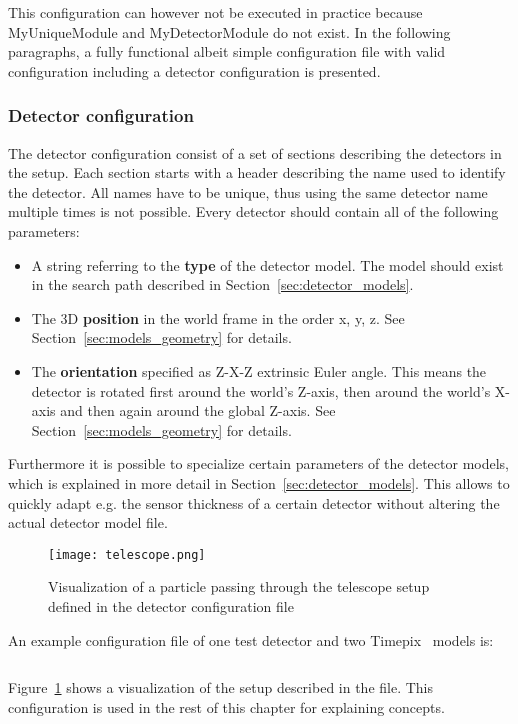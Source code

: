 This configuration can however not be executed in practice because MyUniqueModule and MyDetectorModule do not exist.
In the following paragraphs, a fully functional albeit simple configuration file with valid configuration including a detector configuration is presented.

\subsubsection{Detector configuration}
\label{sec:detector_config}
The detector configuration consist of a set of sections describing the detectors in the setup.
Each section starts with a header describing the name used to identify the detector.
All names have to be unique, thus using the same detector name multiple times is not possible.
Every detector should contain all of the following parameters:
\begin{itemize}
\item A string referring to the \textbf{type} of the detector model.
The model should exist in the search path described in Section~\ref{sec:detector_models}.
\item The 3D \textbf{position} in the world frame in the order x, y, z.
See Section~\ref{sec:models_geometry} for details.
\item The \textbf{orientation} specified as Z-X-Z extrinsic Euler angle.
This means the detector is rotated first around the world's Z-axis, then around the world's X-axis and then again around the global Z-axis.
See Section~\ref{sec:models_geometry} for details.
\end{itemize}
Furthermore it is possible to specialize certain parameters of the detector models, which is explained in more detail in Section~\ref{sec:detector_models}.
This allows to quickly adapt e.g. the sensor thickness of a certain detector without altering the actual detector model file.

\begin{figure}[t]
  \centering
  \texttt{[image: telescope.png]}
  \caption{Visualization of a particle passing through the telescope setup defined in the detector configuration file}
  \label{fig:telescope}
\end{figure}

An example configuration file of one test detector and two Timepix~\cite{timepix} models is:
\inputminted[frame=single,framesep=3pt,breaklines=true,tabsize=2,linenos]{ini}{../../etc/manual_detector.conf}
Figure~\ref{fig:telescope} shows a visualization of the setup described in the file.
This configuration is used in the rest of this chapter for explaining concepts.


